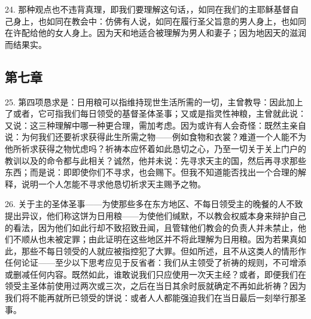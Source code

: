 24. 那种观点也不违背真理，即我们要理解这句话，，如同在我们的主耶稣基督自己身上，也如同在教会中：仿佛有人说，如同在履行圣父旨意的男人身上，也如同在许配给他的女人身上。因为天和地适合被理解为男人和妻子；因为地因天的滋润而结果实。\par


\subsection{第七章}

25. 第四项恳求是：日用粮可以指维持现世生活所需的一切，主曾教导：因此加上了或者，它可指我们每日领受的基督圣体圣事；又或是指灵性神粮，主曾就此说：又说：这三种理解中哪一种更合理，需加考虑。因为或许有人会奇怪：既然主亲自说：为何我们还要祈求获得此生所需之物——例如食物和衣裳？难道一个人能不为他所祈求获得之物忧虑吗？祈祷本应怀着如此恳切之心，乃至一切关于关上门户的教训以及的命令都与此相关？诚然，他并未说：先寻求天主的国，然后再寻求那些东西；而是说：即即使你们不寻求，也会赐下。但我不知道能否找出一个合理的解释，说明一个人怎能不寻求他恳切祈求天主赐予之物。\par

26. 关于主的圣体圣事——为使那些多在东方地区、不每日领受主的晚餐的人不致提出异议，他们称这饼为日用粮——为使他们缄默，不以教会权威本身来辩护自己的看法，因为他们如此行却不致招致丑闻，且管辖他们教会的负责人并未禁止，他们不顺从也未被定罪；由此证明在这些地区并不将此理解为日用粮。因为若果真如此，那些不每日领受的人就应被指控犯了大罪。但如所述，且不从这类人的情形作任何论证——至少以下思考应见于反省者：我们从主领受了祈祷的规则，不可增添或删减任何内容。既然如此，谁敢说我们只应使用一次天主经？或者，即便我们在领受主圣体前使用过两次或三次，之后在当日其余时辰就确定不再如此祈祷？因为我们将不能再就所已领受的饼说：或者人人都能强迫我们在当日最后一刻举行那圣事。\par

